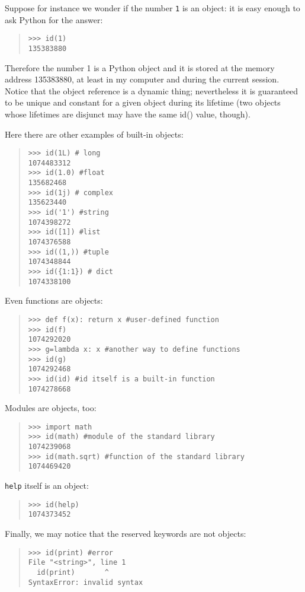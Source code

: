 \documentclass[10pt,english]{article}
\begin{document}
Suppose for instance we wonder if the number \texttt{1} is an object: 
it is easy enough to ask Python for the answer:
\begin{quote}
\begin{verbatim}>>> id(1)
135383880\end{verbatim}
\end{quote}

Therefore the number 1 is a Python object and it is stored at the memory 
address 135383880, at least in my computer and during the current session.
Notice that the object reference is a dynamic thing; nevertheless it
is guaranteed to be unique and constant for a given object during its 
lifetime (two objects whose lifetimes are disjunct may have the same id() 
value, though).

Here there are other examples of built-in objects:
\begin{quote}
\begin{verbatim}>>> id(1L) # long
1074483312
>>> id(1.0) #float
135682468
>>> id(1j) # complex
135623440
>>> id('1') #string
1074398272
>>> id([1]) #list
1074376588
>>> id((1,)) #tuple
1074348844
>>> id({1:1}) # dict
1074338100\end{verbatim}
\end{quote}

Even functions are objects:
\begin{quote}
\begin{verbatim}>>> def f(x): return x #user-defined function
>>> id(f)
1074292020
>>> g=lambda x: x #another way to define functions
>>> id(g)
1074292468
>>> id(id) #id itself is a built-in function
1074278668\end{verbatim}
\end{quote}

Modules are objects, too:
\begin{quote}
\begin{verbatim}>>> import math 
>>> id(math) #module of the standard library
1074239068
>>> id(math.sqrt) #function of the standard library
1074469420\end{verbatim}
\end{quote}

\texttt{help} itself is an object:
\begin{quote}
\begin{verbatim}>>> id(help)
1074373452\end{verbatim}
\end{quote}

Finally, we may notice that the reserved keywords are not objects:
\begin{quote}
\begin{verbatim}>>> id(print) #error
File "<string>", line 1
  id(print)       ^
SyntaxError: invalid syntax\end{verbatim}
\end{quote}
\end{document}
